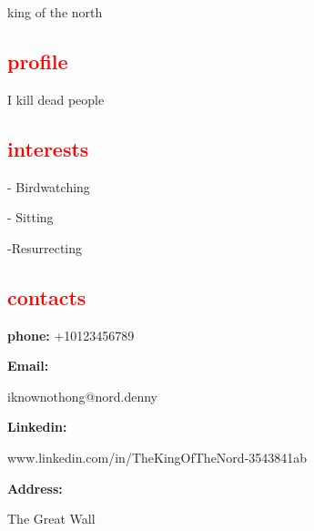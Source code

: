 \documentclass{my_cv}
\begin{document}
\textcolor{red}{\textsf{}}

\begin{tcolorbox}[colframe=white,colback=red!75!green!50,arc=0pt]
king of the north


\end{tcolorbox}

\begin{minipage}{0.30\textwidth}


   \textcolor{red}{\section{profile}} 
    I kill dead people
    \textcolor{red}{\section{interests}} 
    
    - Birdwatching
    
    - Sitting
    
    -Resurrecting
    
    \textcolor{red}{\section{contacts}}
    
    \textbf{phone:} +10123456789
    
    \textbf{Email:}
    
    iknownothong@nord.denny
    
    
    \textbf{Linkedin:} 

    www.linkedin.com/in/TheKingOfTheNord-3543841ab
   \
    
    \textbf{Address:}
    
    The Great Wall 
    
\end{minipage} 
\hspace{1cm}\vrule \hspace{1cm} %
\end{document}
